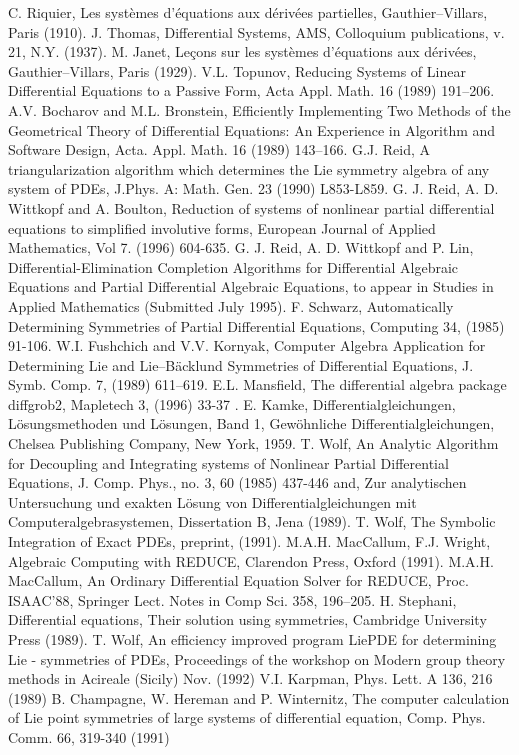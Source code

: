 \documentclass[12pt]{article}
\begin{document}
\begin{thebibliography}{99}
 C. Riquier, Les syst\`{e}mes d'\'{e}quations aux d\'{e}riv\'{e}es
partielles, Gauthier--Villars, Paris (1910).
 J. Thomas, Differential Systems, AMS, Colloquium
publications, v. 21, N.Y. (1937).
 M. Janet, Le\c{c}ons sur les syst\`{e}mes d'\'{e}quations aux 
d\'{e}riv\'{e}es, Gauthier--Villars, Paris (1929).
 V.L. Topunov, Reducing Systems of Linear Differential
Equations to a Passive Form, Acta Appl. Math. 16 (1989) 191--206.
 A.V. Bocharov and M.L. Bronstein, Efficiently
Implementing Two Methods of the Geometrical Theory of Differential
Equations: An Experience in Algorithm and Software Design, Acta. Appl.
Math. 16 (1989) 143--166.
 G.J. Reid, A triangularization algorithm which
determines the Lie symmetry algebra of any system of PDEs, J.Phys. A:
Math. Gen. 23 (1990) L853-L859.
 G. J. Reid, A. D. Wittkopf and A. Boulton, Reduction 
of systems of nonlinear partial differential equations to simplified
involutive forms, European Journal of Applied Mathematics,  
Vol 7. (1996) 604-635.
 G. J. Reid, A. D. Wittkopf and P. Lin, 
Differential-Elimination Completion Algorithms for Differential Algebraic
Equations and Partial Differential Algebraic Equations, to appear in
Studies in Applied Mathematics (Submitted July 1995).
 F. Schwarz, Automatically Determining Symmetries of Partial
Differential Equations, Computing 34, (1985) 91-106.
 W.I. Fushchich and V.V. Kornyak, Computer Algebra
Application for Determining Lie and Lie--B\"{a}cklund Symmetries of
Differential Equations, J. Symb. Comp. 7, (1989) 611--619.
 E.L. Mansfield,
The differential algebra package diffgrob2, Mapletech 3, (1996) 33-37 .
 E. Kamke, Differentialgleichungen, L\"{o}sungsmethoden
und L\"{o}sungen, Band 1, Gew\"{o}hnliche Differentialgleichungen,
Chelsea Publishing Company, New York, 1959.
 T. Wolf, An Analytic Algorithm for Decoupling and Integrating
systems of Nonlinear Partial Differential Equations, J. Comp. Phys.,
no. 3, 60 (1985) 437-446 and, Zur analytischen Untersuchung und exakten
L\"{o}sung von Differentialgleichungen mit Computeralgebrasystemen,
Dissertation B, Jena (1989).
 T. Wolf, The Symbolic Integration of Exact PDEs,
preprint, (1991).
 M.A.H. MacCallum, F.J. Wright, Algebraic Computing with REDUCE,
Clarendon Press, Oxford (1991).
 M.A.H. MacCallum, An Ordinary Differential Equation
Solver for REDUCE, Proc. ISAAC'88, Springer Lect. Notes in Comp Sci.
358, 196--205.
 H. Stephani, Differential equations, Their solution using
symmetries, Cambridge University Press (1989).
 T. Wolf, An efficiency improved program {\sc LiePDE}
for determining Lie - symmetries of PDEs, Proceedings of the workshop on
Modern group theory methods in Acireale (Sicily) Nov. (1992)
 V.I. Karpman, Phys. Lett. A 136, 216 (1989)
 B. Champagne, W. Hereman and P. Winternitz, The computer
      calculation of Lie point symmetries of large systems of differential
      equation, Comp. Phys. Comm. 66, 319-340 (1991)

\end{thebibliography}
 
\end{document}
